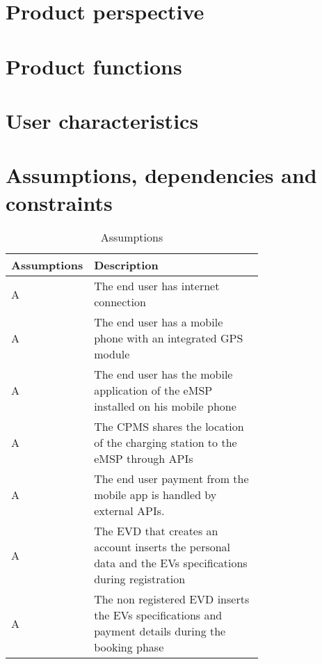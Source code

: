 \section{Product perspective}
\label{sec:product_perspective}%

\section{Product functions}
\label{sec:Product functions}%

\section{User characteristics}
\label{sec:User_characteristics}%

\section{Assumptions, dependencies and constraints}
\label{sec:Assumptions, dependencies and constraints}%
\setcounter{ac}{1}
\newcommand{\acount}{\theac\stepcounter{ac}}
\begin{table}[h!]
    \centering
    \begin{tabular}{|l|p{0.725\linewidth}|}
     \hline
     \textbf{Assumptions} & \textbf{Description} \\
     \hline
     A\acount & The end user has internet connection \\
     \hline
     A\acount & The end user has a mobile phone with an integrated GPS module \\
     \hline
     A\acount & The end user has the mobile application of the eMSP installed on his mobile phone \\
     \hline
     A\acount & The CPMS shares the location of the charging station to the eMSP through APIs\\
     \hline
     A\acount & The end user payment from the mobile app is handled by external APIs.\\
     \hline
     A\acount & The EVD that creates an account inserts the personal data and the EVs specifications during registration \\
     \hline
     A\acount & The non registered EVD inserts the EVs specifications and payment details during the booking phase \\
     \hline
\end{tabular}
    \caption{Assumptions}
    \label{tab:Assumptions}
\end{table}